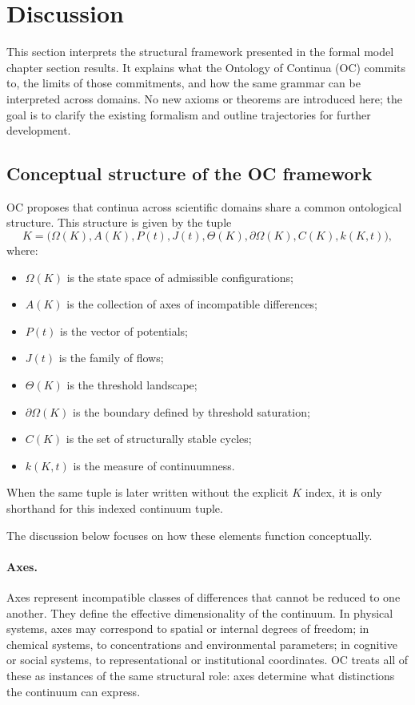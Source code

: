 
\section{Discussion}
\label{sec:discussion}

This section interprets the structural framework presented in
the formal model chapter section results. It explains what the Ontology of
Continua (OC) commits to, the limits of those commitments, and how the same
grammar can be interpreted across domains.
No new axioms or theorems are introduced here; the goal is to clarify the
existing formalism and outline trajectories for further development.

\subsection{Conceptual structure of the OC framework}

OC proposes that continua across scientific domains share a common ontological structure.
This structure is given by the tuple
\[
  K = \big(\Omega(K), A(K), P(t), J(t), \Theta(K), \partial\Omega(K), C(K), k(K,t)\big),
\]
where:
\begin{itemize}
    \item \(\Omega(K)\) is the state space of admissible configurations;
    \item \(A(K)\) is the collection of axes of incompatible differences;
    \item \(P(t)\) is the vector of potentials;
    \item \(J(t)\) is the family of flows;
    \item \(\Theta(K)\) is the threshold landscape;
    \item \(\partial\Omega(K)\) is the boundary defined by threshold saturation;
    \item \(C(K)\) is the set of structurally stable cycles;
    \item \(k(K,t)\) is the measure of continuumness.
\end{itemize}
When the same tuple is later written without the explicit \(K\) index, it is
only shorthand for this indexed continuum tuple.

The discussion below focuses on how these elements function conceptually.

\paragraph{Axes.}
Axes represent incompatible classes of differences that cannot be reduced to one another.
They define the effective dimensionality of the continuum.
In physical systems, axes may correspond to spatial or internal degrees of freedom;
in chemical systems, to concentrations and environmental parameters;
in cognitive or social systems, to representational or institutional coordinates.
OC treats all of these as instances of the same structural role: axes determine what distinctions the continuum can express.

